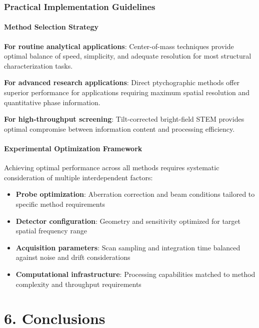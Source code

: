 \documentclass[
  letterpaper,
]{book}
\providecommand{\tightlist}{%
  \setlength{\itemsep}{0pt}\setlength{\parskip}{0pt}}
\begin{document}
\subsection{Practical Implementation
Guidelines}\label{practical-implementation-guidelines}

\subsubsection{Method Selection
Strategy}\label{method-selection-strategy}

\textbf{For routine analytical applications}: Center-of-mass techniques
provide optimal balance of speed, simplicity, and adequate resolution
for most structural characterization tasks.

\textbf{For advanced research applications}: Direct ptychographic
methods offer superior performance for applications requiring maximum
spatial resolution and quantitative phase information.

\textbf{For high-throughput screening}: Tilt-corrected bright-field STEM
provides optimal compromise between information content and processing
efficiency.

\subsubsection{Experimental Optimization
Framework}\label{experimental-optimization-framework}

Achieving optimal performance across all methods requires systematic
consideration of multiple interdependent factors:

\begin{itemize}
\tightlist
\item
  \textbf{Probe optimization}: Aberration correction and beam conditions
  tailored to specific method requirements
\item
  \textbf{Detector configuration}: Geometry and sensitivity optimized
  for target spatial frequency range
\item
  \textbf{Acquisition parameters}: Scan sampling and integration time
  balanced against noise and drift considerations
\item
  \textbf{Computational infrastructure}: Processing capabilities matched
  to method complexity and throughput requirements
\end{itemize}


\chapter{6. Conclusions}\label{conclusions-1}
\end{document}

